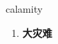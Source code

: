 
\begin{frame}
{\huge calamity}
\begin{center}
\begin{enumerate}\Large
  \item \textbf{大灾难}
\end{enumerate}
\end{center}
\end{frame}
